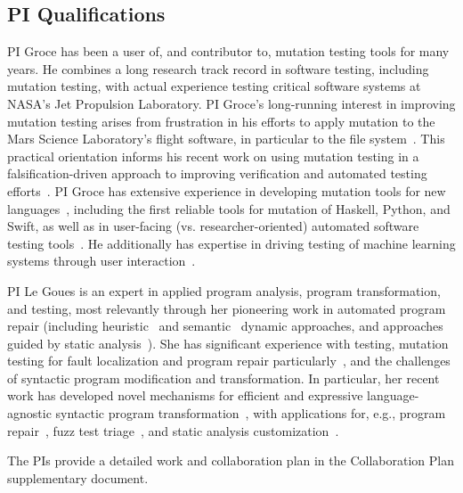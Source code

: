\subsection{PI Qualifications}

PI Groce has been a user of, and contributor to, mutation testing tools for many
years.  He combines a long research track record in software testing, including
mutation testing, with actual experience testing critical software systems at
NASA's Jet Propulsion Laboratory.  PI Groce's long-running interest in improving
mutation testing arises from frustration in his efforts to apply mutation to the
Mars Science Laboratory's flight software, in particular to the file
system~\cite{ICSEDiff,CFV08,AMAI}.  This practical orientation informs his
recent work on using mutation testing in a falsification-driven approach to
improving verification and automated testing
efforts~\cite{groce2015verified,groce2018verified,mutKernel}.  PI Groce has
extensive experience in developing mutation tools for new
languages~\cite{le2014mucheck,muupi,regexpMut}, including the first reliable
tools for mutation of Haskell, Python, and Swift, as well as in user-facing
(vs. researcher-oriented) automated software testing
tools~\cite{tstlsttt,DeepState}.  He additionally has expertise in driving
testing of machine learning systems through user
interaction~\cite{EndUserMistake,OnlyOracle}.

PI Le Goues is an expert in applied program analysis, program transformation,
and testing, most relevantly through her pioneering work in automated program
repair (including heuristic~\cite{legouesNFWTSE2012} and
semantic~\cite{s3,Ke15ase} dynamic approaches, and approaches guided by
static analysis~\cite{footpatch}).  She has significant experience
with testing, mutation testing for fault localization and program repair
particularly~\cite{ssbse}, and the challenges of syntactic program
modification and transformation.  In particular, her recent work has developed
novel mechanisms for efficient and expressive language-agnostic syntactic
program transformation~\cite{rvt-ppc}, with applications for, e.g., program
repair~\cite{footpatch}, fuzz test triage~\cite{vantonder-ase18}, and static analysis
customization~\cite{vantonder-tailoring19}.

The PIs provide a detailed work and collaboration plan in the Collaboration Plan
supplementary document.
